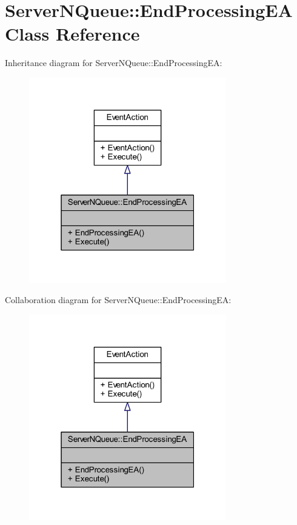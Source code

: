 \hypertarget{class_server_n_queue_1_1_end_processing_e_a}{}\section{Server\+N\+Queue\+:\+:End\+Processing\+EA Class Reference}
\label{class_server_n_queue_1_1_end_processing_e_a}


Inheritance diagram for Server\+N\+Queue\+:\+:End\+Processing\+EA\+:\nopagebreak
\begin{figure}[H]
\begin{center}
\leavevmode
\includegraphics[width=244pt]{class_server_n_queue_1_1_end_processing_e_a__inherit__graph}
\end{center}
\end{figure}


Collaboration diagram for Server\+N\+Queue\+:\+:End\+Processing\+EA\+:\nopagebreak
\begin{figure}[H]
\begin{center}
\leavevmode
\includegraphics[width=244pt]{class_server_n_queue_1_1_end_processing_e_a__coll__graph}
\end{center}
\end{figure}
